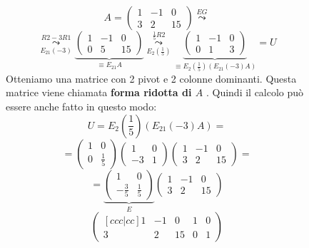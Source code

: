 \documentclass[a4paper]{article}
\theoremstyle{break}
\theoremstyle{break}
\theoremstyle{break}
\theoremstyle{break}
\begin{document}
\begin{figure}[H]
  \begin{example}
    \[
      A = \begin{pmatrix} 
        1 & -1 & 0\\
        3 & 2 & 15
      \end{pmatrix} 
      \stackrel{EG}{\leadsto}
    \] 
    \[
      \stackrel{R2-3R1}{\underset{E_{21}(-3)}{\leadsto}}
      \underbrace{
        \begin{pmatrix} 
          1 & -1 & 0\\
          0 & 5 & 15
      \end{pmatrix}}_{\equiv E_{21}A}
      \stackrel{\frac{1}{5}R2}{\underset{E_2(\frac{1}{5})}{\leadsto}}
      \underbrace{
        \begin{pmatrix} 
          1 & -1 & 0\\
          0 & 1 & 3
      \end{pmatrix}}_{\equiv E_2(\frac{1}{5})(E_{21}(-3)A)}
      =U
    \] 
    Otteniamo una matrice con 2 pivot e 2 colonne dominanti. Questa matrice viene chiamata
    \textbf{forma ridotta di \( A \) }. Quindi il calcolo può essere anche fatto in questo modo:
    \[
      U = E_2\left(\frac{1}{5}\right)(E_{21}(-3)A)=
    \] 
    \[
      = \begin{pmatrix}
        1 & 0\\
        0 & \frac{1}{5}
      \end{pmatrix} 
      \begin{pmatrix} 
        1 & 0\\
        -3 & 1
      \end{pmatrix} 
      \begin{pmatrix} 
        1 & -1 & 0\\
        3 & 2 & 15
      \end{pmatrix} =
    \] 
    \[
      = \underbrace{\begin{pmatrix} 
          1 & 0\\
          -\frac{3}{5} & \frac{1}{5}
      \end{pmatrix} }_{E}
      \begin{pmatrix} 
        1 & -1 & 0\\
        3 & 2 & 15
      \end{pmatrix} 
    \] 
    \vspace{0.5cm}
    \[
      \begin{pmatrix}[ccc|cc]
        1 & -1 & 0 & 1 & 0\\
        3 & 2 & 15 & 0 & 1
      \end{pmatrix} 
\]
\end{example}
\end{figure}
\end{document}
